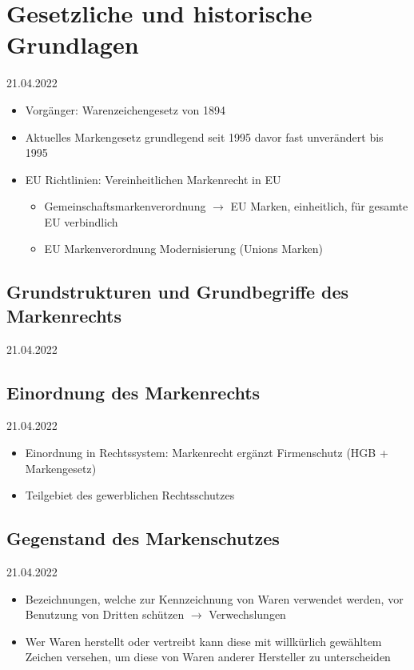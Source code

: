 \documentclass{report}
\begin{document}
\section{Gesetzliche und historische Grundlagen}
21.04.2022
\begin{itemize}
	\item Vorgänger: Warenzeichengesetz von 1894
	\item Aktuelles Markengesetz grundlegend seit 1995
	\newline davor fast unverändert bis 1995
	\item EU Richtlinien: Vereinheitlichen Markenrecht in EU
	\begin{itemize}
		\item Gemeinschaftsmarkenverordnung
		\newline $\rightarrow$ EU Marken, einheitlich, für gesamte EU verbindlich
		\item EU Markenverordnung Modernisierung (Unions Marken)
	\end{itemize}
\end{itemize}

\subsection{Grundstrukturen und Grundbegriffe des Markenrechts}
21.04.2022

\subsection{Einordnung des Markenrechts}
21.04.2022
\begin{itemize}
	\item Einordnung in Rechtssystem:
	\newline Markenrecht ergänzt Firmenschutz (HGB + Markengesetz)
	\item Teilgebiet des gewerblichen Rechtsschutzes
\end{itemize}

\subsection{Gegenstand des Markenschutzes}
21.04.2022
\begin{itemize}
	\item Bezeichnungen, welche zur Kennzeichnung von Waren verwendet werden, vor Benutzung von Dritten schützen $\rightarrow$ Verwechslungen
	\item Wer Waren herstellt oder vertreibt kann diese mit willkürlich gewähltem Zeichen versehen, um diese von Waren anderer Hersteller zu unterscheiden
\end{itemize}
\end{document}
